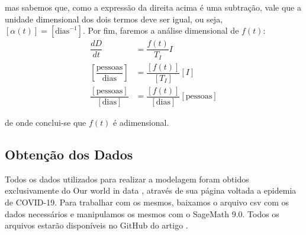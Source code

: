 \documentclass{article}
\begin{document}
\noindent mas sabemos que, como a expressão da direita acima é uma subtração, vale que a unidade dimensional dos dois termos deve ser igual, ou seja, $[\alpha(t)] = [\text{dias}^{-1}]$. Por fim, faremos a análise dimensional de $f(t)$:
\begin{equation*}
    \begin{split}
        \dfrac{dD}{dt} & = \dfrac{f(t)}{T_I}I \\
        \left[\dfrac{\text{pessoas}}{\text{dias}}\right] & = \dfrac{[f(t)]}{[T_I]}[I] \\
        \dfrac{[\text{pessoas}]}{[\text{dias}]} & = \dfrac{[f(t)]}{[\text{dias}]}[\text{pessoas}]
    \end{split}
\end{equation*}

\noindent de onde conclui-se que $f(t)$ é adimensional.

\subsection{Obtenção dos Dados}

Todos os dados utilizados para realizar a modelagem foram obtidos exclusivamente do Our world in data \cite{owid}, através de sua página voltada a epidemia de COVID-19. Para trabalhar com os mesmos, baixamos o arquivo csv com os dados necessários e manipulamos os mesmos com o SageMath 9.0. Todos os arquivos estarão disponíveis no GitHub do artigo \cite{github}.

\printbibliography
\end{document}

